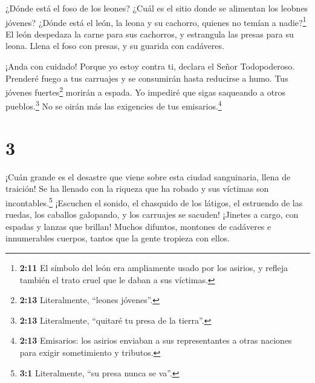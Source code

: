 ¿Dónde está el foso de los leones? ¿Cuál es el sitio
donde se alimentan los leobnes jóvenes? ¿Dónde está el león, la leona y
su cachorro, quienes no temían a nadie?\footnote{\textbf{2:11} El
  símbolo del león era ampliamente usado por los asirios, y refleja
  también el trato cruel que le daban a sus víctimas.} 
El león despedaza la carne para sus cachorros, y estrangula las presas
para su leona. Llena el foso con presas, y su guarida con cadáveres.

 ¡Anda con cuidado! Porque yo estoy contra ti, declara el
Señor Todopoderoso. Prenderé fuego a tus carruajes y se consumirán hasta
reducirse a humo. Tus jóvenes fuertes\footnote{\textbf{2:13}
  Literalmente, ``leones jóvenes''.} morirán a espada. Yo impediré que
sigas saqueando a otros pueblos.\footnote{\textbf{2:13} Literalmente,
  ``quitaré tu presa de la tierra''.} No se oirán más las exigencies de
tus emisarios.\footnote{\textbf{2:13} Emisarios: los asirios enviaban a
  sus representantes a otras naciones para exigir sometimiento y
  tributos.}

\hypertarget{section-2}{%
\section{3}\label{section-2}}

 ¡Cuán grande es el desastre que viene sobre esta ciudad
sanguinaria, llena de traición! Se ha llenado con la riqueza que ha
robado y sus víctimas son incontables.\footnote{\textbf{3:1}
  Literalmente, ``su presa nunca se va''.}  ¡Escuchen el
sonido, el chasquido de los látigos, el estruendo de las ruedas, los
caballos galopando, y los carruajes se sacuden!  ¡Jinetes
a cargo, con espadas y lanzas que brillan! Muchos difuntos, montones de
cadáveres e innumerables cuerpos, tantos que la gente tropieza con
ellos.

